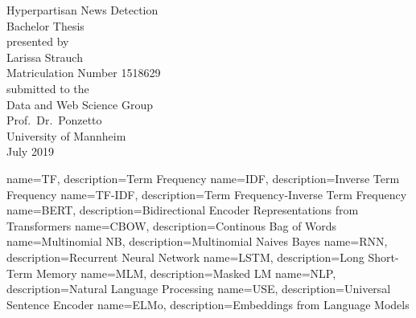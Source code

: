 \documentclass[a4paper, 11pt,titlepage,oneside,openany]{book}
\begin{document}
\begin{titlepage}
	\vspace*{2cm}
  \begin{center}
   {\Large Hyperpartisan News Detection\\}
   \vspace{2cm} 
   {Bachelor Thesis\\}
   \vspace{2cm}
   {presented by\\
    Larissa Strauch \\
    Matriculation Number 1518629\\
   }
   \vspace{1cm} 
   {submitted to the\\
    Data and Web Science Group\\
    Prof.\ Dr.\ Ponzetto\\
    University of Mannheim\\} \vspace{2cm}
   {July 2019}
  \end{center}
\end{titlepage} 

\tableofcontents
\newpage

\listofalgorithms
\listoffigures

\listoftables

{
	name=TF,
	description={Term Frequency}
}
{
	name=IDF,
	description={Inverse Term Frequency}
}
{
	name=TF-IDF,
	description={Term Frequency-Inverse Term Frequency}
}
{
	name=BERT,
	description={Bidirectional Encoder Representations from Transformers}
}
{
	name=CBOW,
	description={Continous Bag of Words}
}
{
	name=Multinomial NB,
	description={Multinomial Naives Bayes}
}
{
	name=RNN,
	description={Recurrent Neural Network}
}
{
	name=LSTM,
	description={Long Short-Term Memory}
}
{
	name=MLM,
	description={Masked LM}
}
{
	name=NLP,
	description={Natural Language Processing}
}
{
	name=USE,
	description={Universal Sentence Encoder}
}
{
	name=ELMo,
	description={Embeddings from Language Models}
}
\printglossaries %
\end{document}
